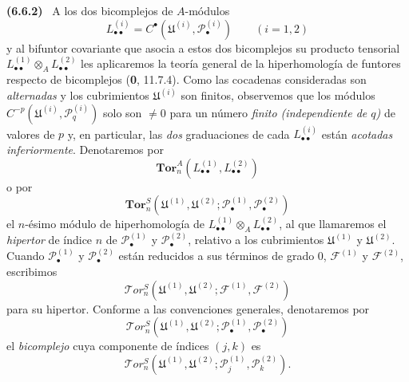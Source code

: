 \documentclass[10pt,oneside]{book}
\newenvironment{env}[1][]{\par\medskip\noindent\textbf{(#1)}\ }{\par}
\begin{document}
\begin{env}[6.6.2]
\label{III.6.6.2}
A los dos bicomplejos de $A$-módulos
\[
  L_{\bullet\bullet}^{(i)}
  =C^\bullet(\mathfrak U^{(i)},\mathscr P_\bullet^{(i)})
  \qquad(i=1,2)
\]
y al bifuntor covariante que asocia a estos dos bicomplejos su producto
tensorial $L_{\bullet\bullet}^{(1)}\otimes_A L_{\bullet\bullet}^{(2)}$ les
aplicaremos la teoría general de la hiperhomología de funtores respecto de
bicomplejos (\textbf{0}, 11.7.4). Como las cocadenas consideradas son
\emph{alternadas} y los cubrimientos $\mathfrak U^{(i)}$ son finitos, observemos que
los módulos $C^{-p}(\mathfrak U^{(i)},\mathscr P_q^{(i)})$ solo son $\ne0$
para un número \emph{finito (independiente de $q$)} de valores de $p$ y, en
particular, las \emph{dos} graduaciones de cada $L_{\bullet\bullet}^{(i)}$ están
\emph{acotadas inferiormente}. Denotaremos por
\[
  \mathbf{Tor}_n^A(L_{\bullet\bullet}^{(1)},L_{\bullet\bullet}^{(2)})
\]
o por
\[
  \mathbf{Tor}_n^S
  (\mathfrak U^{(1)},\mathfrak U^{(2)};
   \mathscr P_\bullet^{(1)},\mathscr P_\bullet^{(2)})
\]
el $n$-ésimo módulo de hiperhomología de
$L_{\bullet\bullet}^{(1)}\otimes_A L_{\bullet\bullet}^{(2)}$, al que
llamaremos el \emph{hipertor} de índice $n$ de
$\mathscr P_\bullet^{(1)}$ y $\mathscr P_\bullet^{(2)}$, relativo a los
cubrimientos $\mathfrak U^{(1)}$ y $\mathfrak U^{(2)}$. Cuando
$\mathscr P_\bullet^{(1)}$ y $\mathscr P_\bullet^{(2)}$ están reducidos a sus
términos de grado 0, $\mathscr F^{(1)}$ y $\mathscr F^{(2)}$, escribimos
\[
  \mathscr{T}\!or_n^S
  (\mathfrak U^{(1)},\mathfrak U^{(2)};
   \mathscr F^{(1)},\mathscr F^{(2)})
\]
para su hipertor. Conforme a las convenciones generales, denotaremos por
\[
  \mathscr{T}\!or_n^S
  (\mathfrak U^{(1)},\mathfrak U^{(2)};
   \mathscr P_\bullet^{(1)},\mathscr P_\bullet^{(2)})
\]
el \emph{bicomplejo} cuya componente de índices $(j,k)$ es
\[
  \mathscr{T}\!or_n^S
  (\mathfrak U^{(1)},\mathfrak U^{(2)};
   \mathscr P_j^{(1)},\mathscr P_k^{(2)}).
\]


\end{env}
\end{document}
